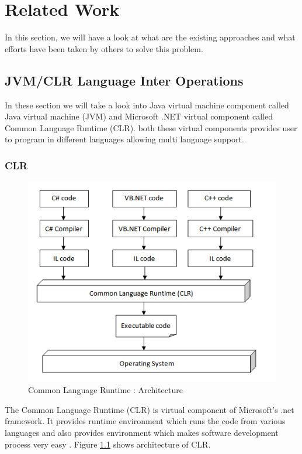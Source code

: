 \chapter{Related Work}
In this section, we will have a look at what are the existing approaches and what efforts
have been taken by others to solve this problem.

\section{JVM/CLR Language Inter Operations}

In these section we will take a look into Java virtual machine component called Java virtual machine (JVM) and Microsoft .NET virtual component called Common Language Runtime (CLR). both these virtual components provides user to program in different languages allowing multi language support. 

\subsection{CLR}

\begin{figure}[ht]
	\begin{center}
		\includegraphics[width=\linewidth]{./images/clrArchitecture.png}
	\end{center}
	\caption{Common Language Runtime : Architecture \cite{clrarchitecure}}
	\label{fig:clrarchitecture}
\end{figure}

The Common Language Runtime (CLR) is virtual component of Microsoft's .net framework. It provides runtime environment which runs the code from various languages and also provides environment which makes software development process very easy \cite{Kennedy:2001:DIG:381694.378797}. Figure \ref{fig:clrarchitecture} shows architecture of CLR.

